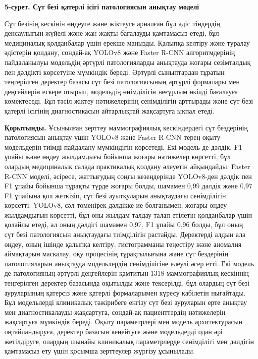 {\bfseries 5-сурет. Сүт безі қатерлі ісігі патологиясын анықтау моделі}

Сүт безінің кескінін өңдеуге және жіктеуге арналған бұл әдіс тіндердің
денсаулығын жүйелі және жан-жақты бағалауды қамтамасыз етеді, бұл
медициналық қолданбалар үшін ерекше маңызды. Қалыпқа келтіру және
туралау әдістерін қолдану, сондай-ақ YOLOv8 және Faster R-CNN
алгоритмдерінің пайдаланылуы модельдің әртүрлі патологияларды анықтауда
жоғары сезімталдық пен дәлдікті көрсетуіне мүмкіндік береді. Әртүрлі
сыныптардан тұратын теңгерілген деректер базасы сүт безі патологиясының
әртүрлі формалары мен деңгейлерін ескере отырып, модельдің өнімділігін
неғұрлым өкілді бағалауға көмектеседі. Бұл тәсіл жіктеу нәтижелерінің
сенімділігін арттырады және сүт безі қатерлі ісігінің диагностикасын
айтарлықтай жақсартуға ықпал етеді.

{\bfseries Қорытынды.} Ұсынылған зерттеу маммографиялық кескіндердегі сүт
бездерінің патологиясын анықтау үшін YOLOv8 және Faster R-CNN терең
оқыту модельдерін тиімді пайдалану мүмкіндігін көрсетеді. Екі модель де
дәлдік, F1 ұпайы және өңдеу жылдамдығы бойынша жоғары нәтижелер
көрсетті, бұл олардың медициналық салада практикалық қолдану әлеуетін
айқындайды. Faster R-CNN моделі, әсіресе, жаттығудың соңғы кезеңдерінде
YOLOv8-ден дәлдік пен F1 ұпайы бойынша тұрақты түрде жоғары болды,
шамамен 0,99 дәлдік және 0,97 F1 ұпайына қол жеткізіп, сүт безі
ауытқуларын анықтаудағы сенімділігін көрсетті. YOLOv8, сәл төменірек
дәлдікке ие болғанымен, жоғары өңдеу жылдамдығын көрсетті, бұл оны
жылдам талдау талап етілетін қолданбалар үшін қолайлы етеді, ал оның
дәлдігі шамамен 0,97, F1 ұпайы 0,96 болды, бұл оның сүт безі
патологиясын анықтаудағы тиімділігін растайды. Деректерді алдын ала
өңдеу, оның ішінде қалыпқа келтіру, гистограмманы теңестіру және
аномалия аймақтарын маскалау, оқу процесінің тұрақтылығына және сүт
бездерінің патологияларын анықтауда модельлердің сенімділігіне елеулі
әсер етті. Екі модель де патологияның әртүрлі деңгейлерін қамтитын 1318
маммографиялық кескіннің теңгерілген деректер базасында оқытылды және
тексерілді, бұл олардың сүт безі ауруларының қатерсіз және қатерлі
формаларымен күресу қабілетін нығайтады. Бұл модельлерді клиникалық
тәжірибеге енгізу сүт безі ауруларын ерте анықтау мен диагностикалауды
жақсартуға, сондай-ақ пациенттердің нәтижелерін жақсартуға мүмкіндік
береді. Оқыту параметрлері мен модель архитектурасын оңтайландыруға,
деректер базасын кеңейтуге және модельдерді одан әрі жетілдіруге,
олардың шынайы клиникалық параметрлерде сенімділігі мен дәлдігін
қамтамасыз ету үшін қосымша зерттеулер жүргізу ұсынылады.

